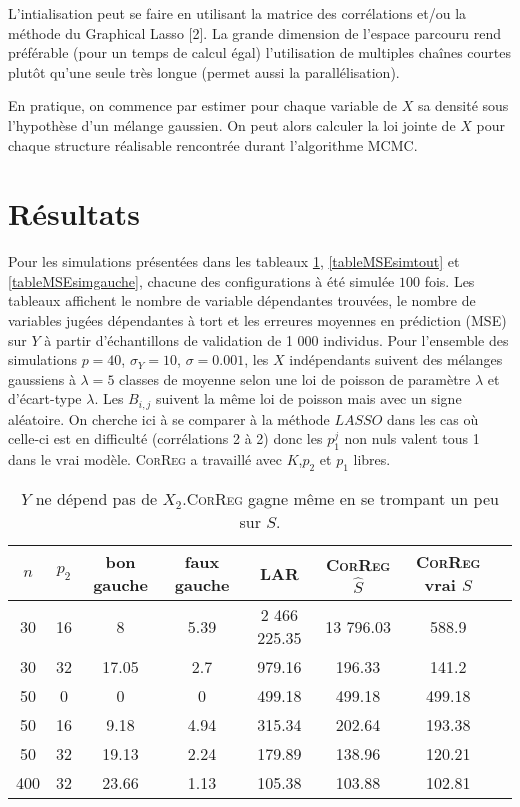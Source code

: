 \documentclass[12pt]{article}
\begin{document}
L'intialisation peut se faire en utilisant la matrice des corrélations et/ou la méthode du Graphical Lasso [2].		
La grande dimension de l'espace parcouru rend préférable  (pour un temps de calcul égal) l'utilisation de multiples chaînes courtes plutôt qu'une seule très longue (permet aussi la parallélisation).
	
	En pratique, on commence par estimer pour chaque variable de $X$ sa densité sous l'hypothèse d'un mélange gaussien. On peut alors calculer la loi jointe de $X$ pour chaque structure réalisable rencontrée durant l'algorithme MCMC.
\section{Résultats}	
Pour les simulations présentées dans les tableaux \ref{tableMSEsimdroite}, \ref{tableMSEsimtout} et \ref{tableMSEsimgauche}, chacune des configurations à été simulée $100$ fois. Les tableaux affichent le nombre de variable dépendantes trouvées, le nombre de variables jugées dépendantes à tort et les erreures moyennes en prédiction (MSE) sur $Y$ à partir d'échantillons de validation de 1 000 individus. Pour l'ensemble des simulations $p=40$, $\sigma_Y=10$, $\sigma=0.001$, les $X$ indépendants suivent des mélanges gaussiens à $\lambda=5$ classes de moyenne selon une loi de poisson de paramètre $\lambda$ et d'écart-type $\lambda$. Les $B_{i,j}$ suivent la même loi de poisson mais avec un signe aléatoire. On cherche ici à se comparer à la méthode $LASSO$ dans les cas où celle-ci est en difficulté (corrélations 2 à 2) donc les $p_1^j$ non nuls valent tous 1 dans le vrai modèle. \textsc{CorReg}  a  travaillé avec $K$,$p_2$ et $p_1$ libres. 

\begin{table}
\centering
\begin{tabular}{|c|c|c|c|c|c|c|c|}
\hline 
$n$ & $p_2$ & bon gauche & faux gauche    & LAR  &    \textsc{CorReg} $\hat S$& \textsc{CorReg} vrai $S$\\ 
\hline 
30 & 16 &  8 & 5.39 & 2 466 225.35 & 13 796.03 & 588.9\\ 
\hline 
30 & 32 & 17.05 & 2.7 & 979.16 & 196.33 & 141.2\\ 
\hline 
\hline 
50 & 0 & 0 & 0 & 499.18 & 499.18 & 499.18 \\ 
\hline 
50 & 16 & 9.18 & 4.94 & 315.34 & 202.64 & 193.38 \\ 
\hline 
50 & 32 & 19.13 & 2.24 & 179.89 & 138.96 & 120.21 \\ 
\hline \hline
400 & 32 & 23.66 & 1.13 & 105.38 & 103.88 & 102.81\\ 
\hline 
\end{tabular} 
\caption{$Y$ ne dépend pas de $X_2$.\textsc{CorReg} gagne même en se trompant un peu sur $S$.} \label{tableMSEsimdroite}
\end{table}
\end{document}
